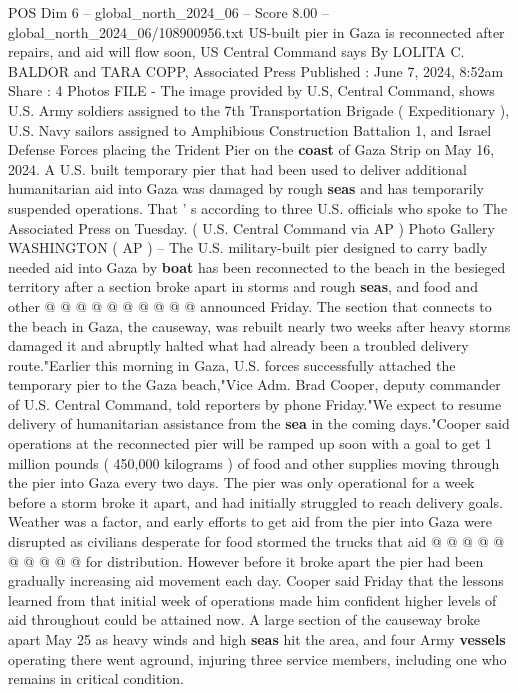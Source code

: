 \begin{textsample}{POS Dim 6 – global\_north\_2024\_06 – Score 8.00 – global\_north\_2024\_06/108900956.txt}  \label{ex:f6_pos_141}
US-built pier in Gaza is reconnected after repairs, and aid will flow soon, US Central Command says By LOLITA C.
BALDOR and TARA COPP, Associated Press Published : June 7, 2024, 8:52am Share : 4 Photos FILE - The image provided by U.S, Central Command, shows U.S.
Army soldiers assigned to the 7th Transportation Brigade ( Expeditionary ), U.S.
Navy sailors assigned to Amphibious Construction Battalion 1, and Israel Defense Forces placing the Trident Pier on the \textbf{coast} of Gaza Strip on May 16, 2024.
A U.S. built temporary pier that had been used to deliver additional humanitarian aid into Gaza was damaged by rough \textbf{seas} and has temporarily suspended operations.
That ' s according to three U.S. officials who spoke to The Associated Press on Tuesday. ( U.S.
Central Command via AP ) Photo Gallery WASHINGTON ( AP ) -- The U.S. military-built pier designed to carry badly needed aid into Gaza by \textbf{boat} has been reconnected to the beach in the besieged territory after a section broke apart in storms and rough \textbf{seas}, and food and other @ @ @ @ @ @ @ @ @ @ announced Friday.
The section that connects to the beach in Gaza, the causeway, was rebuilt nearly two weeks after heavy storms damaged it and abruptly halted what had already been a troubled delivery route."Earlier this morning in Gaza, U.S. forces successfully attached the temporary pier to the Gaza beach,"Vice Adm.
Brad Cooper, deputy commander of U.S.
Central Command, told reporters by phone Friday."We expect to resume delivery of humanitarian assistance from the \textbf{sea} in the coming days."Cooper said operations at the reconnected pier will be ramped up soon with a goal to get 1 million pounds ( 450,000 kilograms ) of food and other supplies moving through the pier into Gaza every two days.
The pier was only operational for a week before a storm broke it apart, and had initially struggled to reach delivery goals.
Weather was a factor, and early efforts to get aid from the pier into Gaza were disrupted as civilians desperate for food stormed the trucks that aid @ @ @ @ @ @ @ @ @ @ for distribution.
However before it broke apart the pier had been gradually increasing aid movement each day.
Cooper said Friday that the lessons learned from that initial week of operations made him confident higher levels of aid throughout could be attained now.
A large section of the causeway broke apart May 25 as heavy winds and high \textbf{seas} hit the area, and four Army \textbf{vessels} operating there went aground, injuring three service members, including one who remains in critical condition.

\end{textsample}
